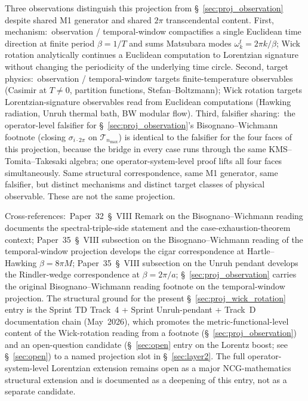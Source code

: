 \documentclass[11pt]{article}
\begin{document}
Three observations distinguish this projection from
\S~\ref{sec:proj_observation} despite shared M1 generator and
shared $2\pi$ transcendental content.
First, mechanism:\ observation / temporal-window compactifies a
single Euclidean time direction at finite period $\beta = 1/T$ and
sums Matsubara modes $\omega_k^t = 2\pi k / \beta$; Wick rotation
analytically continues a Euclidean computation to Lorentzian
signature without changing the periodicity of the underlying time
circle.
Second, target physics:\ observation / temporal-window targets
finite-temperature observables (Casimir at $T \neq 0$, partition
functions, Stefan--Boltzmann); Wick rotation targets
Lorentzian-signature observables read from Euclidean computations
(Hawking radiation, Unruh thermal bath, BW modular flow).
Third, falsifier sharing:\ the operator-level falsifier for
\S~\ref{sec:proj_observation}'s Bisognano--Wichmann footnote
(closing $\sigma_{i\cdot 2\pi}$ on $\mathcal{T}_{n_{\max}}$) is
identical to the falsifier for the four faces of this projection,
because the bridge in every case runs through the same
KMS--Tomita--Takesaki algebra; one operator-system-level proof
lifts all four faces simultaneously.  Same structural correspondence,
same M1 generator, same falsifier, but distinct mechanisms and
distinct target classes of physical observable.  These are not the
same projection.

Cross-references:\ Paper~32~\S~VIII Remark on the Bisognano--Wichmann
reading documents the spectral-triple-side statement and the
case-exhaustion-theorem context; Paper~35~\S~VIII subsection on the
Bisognano--Wichmann reading of the temporal-window projection
develops the cigar correspondence at Hartle--Hawking
$\beta = 8\pi M$; Paper~35~\S~VIII subsection on the Unruh pendant
develops the Rindler-wedge correspondence at $\beta = 2\pi / a$;
\S~\ref{sec:proj_observation} carries the original
Bisognano--Wichmann reading footnote on the temporal-window
projection.  The structural ground for the present \S~\ref{sec:proj_wick_rotation}
entry is the Sprint TD Track~4 + Sprint Unruh-pendant + Track~D
documentation chain (May~2026), which promotes the metric-functional-level
content of the Wick-rotation reading from a footnote (\S~\ref{sec:proj_observation})
and an open-question candidate (\S~\ref{sec:open} entry
on the Lorentz boost; see \S~\ref{sec:open}) to a named projection
slot in \S~\ref{sec:layer2}.  The full operator-system-level
Lorentzian extension remains open as a major NCG-mathematics
structural extension and is documented as a deepening of this entry,
not as a separate candidate.
\end{document}
